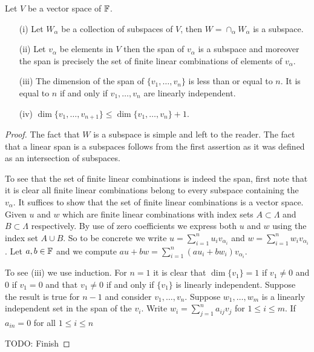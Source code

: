 \begin{prop}Let $V$ be a vector space of $\mathbb{F}$. 
\begin{itemize}
\item[(i)]Let $W_\alpha$ be a collection of subspaces of $V$, then $W = \cap_\alpha W_\alpha$ is a subspace.  
\item[(ii)] Let $v_\alpha$ be elements in $V$ then the span of $v_\alpha$ is a subspace and moreover the span is precisely the set of finite linear combinations of elements of $v_\alpha$.  
\item[(iii)]The dimension of the span of $\lbrace v_1, \dotsc, v_n \rbrace$ is less than or equal to $n$.  It is equal to $n$ if and only if $v_1, \dotsc, v_n$ are linearly independent.
\item[(iv)]$\dim \lbrace v_1, \dotsc, v_{n+1} \rbrace \leq \dim \lbrace v_1, \dotsc, v_n \rbrace + 1$.
\end{itemize}
\end{prop}
\begin{proof}
The fact that $W$ is a subspace is simple and left to the reader.  The fact that a linear span is a subspaces follows from the first assertion as it was defined as an intersection of subspaces.  

To see that the set of finite linear combinations is indeed the span, first note that it is clear all finite linear combinations belong to every subspace containing the $v_\alpha$.  It suffices to show that the set of finite linear combinations is a vector space.  Given $u$ and $w$ which are finite linear combinations with index sets $A \subset \Lambda$ and $B \subset \Lambda$ respectively.  By use of zero coefficients we express both $u$ and $w$ using the index set $A \cup B$.  So to be concrete we write $u = \sum_{i=1}^n u_i v_{\alpha_i}$ and $w = \sum_{i=1}^n w_i v_{\alpha_i}$.  Let $a,b \in \mathbb{F}$ and we compute $au + bw = \sum_{i=1}^n (au_i + bw_i) v_{\alpha_i}$.

To see (iii) we use induction.  For $n=1$ it is clear that $\dim\lbrace v_1 \rbrace = 1$ if $v_1 \neq 0$ and $0$ if $v_1 = 0$ and that $v_1 \neq 0$ if and only if $\lbrace v_1 \rbrace$ is linearly independent.  Suppose the result is true for $n-1$ and consider $v_1, \dots, v_n$.  Suppose $w_1, \dotsc, w_m$ is a linearly independent set in the span of the $v_i$.  Write
$w_i = \sum_{j=1}^n a_{ij} v_j$ for $1 \leq i \leq m$.  If $a_{in}=0$ for all $1 \leq i \leq n$

TODO: Finish
\end{proof}


